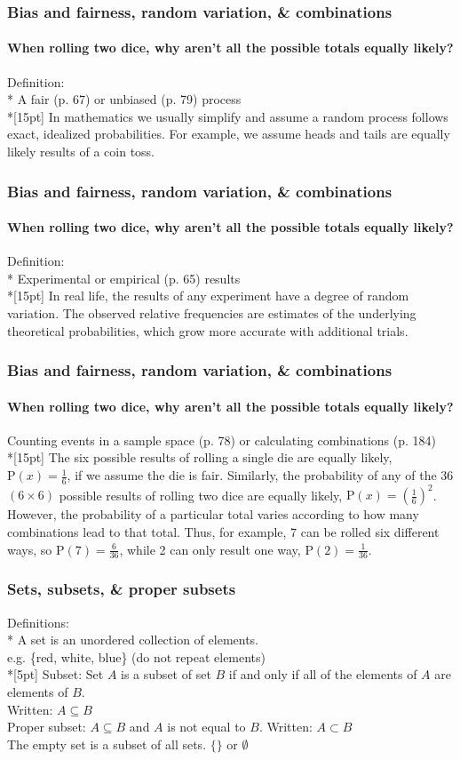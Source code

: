 \documentclass{beamer}
\begin{document}
\frame
{
  \frametitle{Bias and fairness, random variation, \& combinations}
  \framesubtitle{When rolling two dice, why aren't all the possible totals equally likely?}
  Definition:\\*
  A \alert{fair} (p. 67) or \alert{unbiased} (p. 79) process \\*[15pt]
  In mathematics we usually simplify and assume a random process follows exact, idealized probabilities. For example, we assume heads and tails are equally likely results of a coin toss.
  
}

\frame
{
  \frametitle{Bias and fairness, random variation, \& combinations}
  \framesubtitle{When rolling two dice, why aren't all the possible totals equally likely?}
  Definition:\\*
  \alert{Experimental} or \alert{empirical} (p. 65) results \\*[15pt]
  In real life, the results of any experiment have a degree of \alert{random variation}. The observed relative frequencies are estimates of the underlying theoretical probabilities, which grow more accurate with additional trials.
  
}

\frame
{
  \frametitle{Bias and fairness, random variation, \& combinations}
  \framesubtitle{When rolling two dice, why aren't all the possible totals equally likely?}
  Counting events in a \alert{sample space} (p. 78) or calculating \alert{combinations} (p. 184) \\*[15pt]
  The six possible results of rolling a single die are equally likely, $\mathrm P(x)=\frac{1}{6}$, if we assume the die is fair. Similarly, the probability of any of the 36 $(6 \times 6)$ possible results of rolling two dice are equally likely, $\mathrm P(x)=(\frac{1}{6})^2$. However, the probability of a particular total varies according to how many combinations lead to that total. Thus, for example, 7 can be rolled six different ways, so $\mathrm P(7)=\frac{6}{36}$, while 2 can only result one way, $\mathrm P(2)=\frac{1}{36}$.
  
}

\frame
{
  \frametitle{Sets, subsets, \& proper subsets}
  
  Definitions:\\*
  A \alert{set} is an unordered collection of elements.\\ e.g. \{red, white, blue\} (do not repeat elements)\\*[5pt]
  \alert{Subset}: Set $A$ is a subset of set $B$ if and only if all of the elements of $A$ are elements of $B$.\\
  Written: $A \subseteq B$\\[5pt]
  \alert{Proper subset}: $A \subseteq B$ and $A$ is not equal to $B$. Written: $A \subset B$\\[5pt]
  The \alert{empty set} is a subset of all sets. $\{\} \text{ or } \emptyset$
  
}
\end{document}
